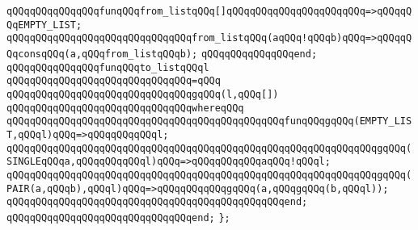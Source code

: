 \verb|qQQqqQQqqQQqqQQqfunqQQqfrom_listqQQq[]qQQqqQQqqQQqqQQqqQQqqQQq=>qQQqqQQqEMPTY_LIST;|\newline
\verb|qQQqqQQqqQQqqQQqqQQqqQQqqQQqqQQqfrom_listqQQq(aqQQq!qQQqb)qQQq=>qQQqqQQqconsqQQq(a,qQQqfrom_listqQQqb);|\newline
\verb|qQQqqQQqqQQqqQQqend;|\newline
\newline
\verb|qQQqqQQqqQQqqQQqfunqQQqto_listqQQql|\newline
\verb|qQQqqQQqqQQqqQQqqQQqqQQqqQQqqQQq=qQQq|\newline
\verb|qQQqqQQqqQQqqQQqqQQqqQQqqQQqqQQqgqQQq(l,qQQq[])|\newline
\verb|qQQqqQQqqQQqqQQqqQQqqQQqqQQqqQQqwhereqQQq|\newline
\newline
\verb|qQQqqQQqqQQqqQQqqQQqqQQqqQQqqQQqqQQqqQQqqQQqqQQqfunqQQqgqQQq(EMPTY_LIST,qQQql)qQQq=>qQQqqQQqqQQql;|\newline
\verb|qQQqqQQqqQQqqQQqqQQqqQQqqQQqqQQqqQQqqQQqqQQqqQQqqQQqqQQqqQQqqQQqgqQQq(SINGLEqQQqa,qQQqqQQqqQQql)qQQq=>qQQqqQQqqQQqaqQQq!qQQql;|\newline
\verb|qQQqqQQqqQQqqQQqqQQqqQQqqQQqqQQqqQQqqQQqqQQqqQQqqQQqqQQqqQQqqQQqgqQQq(PAIR(a,qQQqb),qQQql)qQQq=>qQQqqQQqqQQqgqQQq(a,qQQqgqQQq(b,qQQql));|\newline
\verb|qQQqqQQqqQQqqQQqqQQqqQQqqQQqqQQqqQQqqQQqqQQqqQQqend;|\newline
\verb|qQQqqQQqqQQqqQQqqQQqqQQqqQQqqQQqend;|\newline
\verb|};|\newline
\newline
\newline

